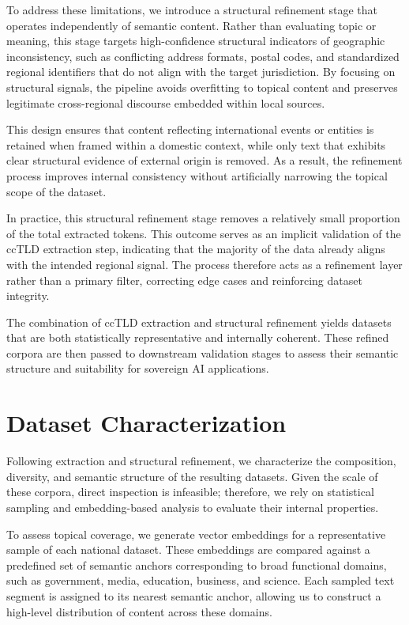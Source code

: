 \documentclass[11pt, a4paper]{article}
\begin{document}
To address these limitations, we introduce a structural refinement stage that operates independently of semantic content. Rather than evaluating topic or meaning, this stage targets high-confidence structural indicators of geographic inconsistency, such as conflicting address formats, postal codes, and standardized regional identifiers that do not align with the target jurisdiction. By focusing on structural signals, the pipeline avoids overfitting to topical content and preserves legitimate cross-regional discourse embedded within local sources.

This design ensures that content reflecting international events or entities is retained when framed within a domestic context, while only text that exhibits clear structural evidence of external origin is removed. As a result, the refinement process improves internal consistency without artificially narrowing the topical scope of the dataset.

In practice, this structural refinement stage removes a relatively small proportion of the total extracted tokens. This outcome serves as an implicit validation of the ccTLD extraction step, indicating that the majority of the data already aligns with the intended regional signal. The process therefore acts as a refinement layer rather than a primary filter, correcting edge cases and reinforcing dataset integrity.

The combination of ccTLD extraction and structural refinement yields datasets that are both statistically representative and internally coherent. These refined corpora are then passed to downstream validation stages to assess their semantic structure and suitability for sovereign AI applications.

\section{Dataset Characterization}

Following extraction and structural refinement, we characterize the composition, diversity, and semantic structure of the resulting datasets. Given the scale of these corpora, direct inspection is infeasible; therefore, we rely on statistical sampling and embedding-based analysis to evaluate their internal properties.

To assess topical coverage, we generate vector embeddings for a representative sample of each national dataset. These embeddings are compared against a predefined set of semantic anchors corresponding to broad functional domains, such as government, media, education, business, and science. Each sampled text segment is assigned to its nearest semantic anchor, allowing us to construct a high-level distribution of content across these domains.
\end{document}
